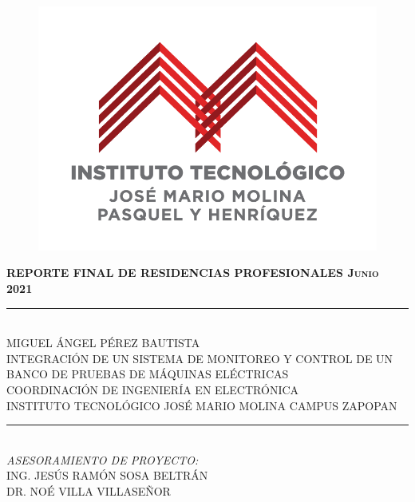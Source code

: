 \documentclass[12pt,titlepage]{article}
\begin{document}
\setlength{\parindent}{1.1cm} %
\setcounter{tocdepth}{4}
\setcounter{secnumdepth}{4}
\renewcommand{\labelitemi}{$\cdot$} %

\begin{titlepage} %

\begin{center} %
\begin{figure}[htbp]
\hspace*{2.0cm} 
\includegraphics[scale=1.99]{Tec_logo2}
\end{figure}

 \hspace{17mm}\textbf{\textsc{REPORTE FINAL DE RESIDENCIAS PROFESIONALES \newline
 Junio 2021}}\\[10mm]
 \rule{\linewidth}{1.0mm} 
 \newline
 \uppercase{\\ Miguel ángel pérez bautista }\\[4.5mm]
 \uppercase{Integración de un sistema de monitoreo y control de un banco de pruebas de máquinas eléctricas}\\[4.5mm]
 \uppercase{Coordinación de ingeniería en electrónica}\\[4.5mm]
  \uppercase{Instituto Tecnológico José Mario Molina Campus Zapopan}\\[4.5mm]
 \rule{\linewidth}{1.0mm}
 \vspace{5mm}
 \uppercase{\\ \textit{Asesoramiento de proyecto:}}\\[4.5mm]
 \uppercase{   Ing. Jesús Ramón Sosa Beltrán}\\[5mm]
 \uppercase{Dr. Noé Villa Villaseñor}\\[5mm]

\end{center}
\end{titlepage} %
\newpage %
\end{document}
